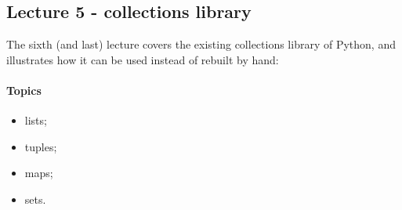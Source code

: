 			\subsection{Lecture 5 - collections library}
				The sixth (and last) lecture covers the existing collections library of Python, and illustrates how it can be used instead of rebuilt by hand:

				\paragraph*{Topics}
					\begin{itemize}
						\item lists;
						\item tuples;
						\item maps;
						\item sets.
					\end{itemize}
